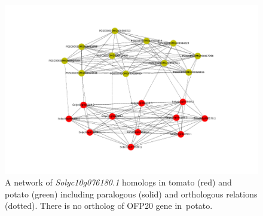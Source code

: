 \documentclass[applsci,article,accept,moreauthors,pdftex]{Definitions/mdpi}
\begin{document}
{ 
 \unskip
\begin{figure}[H]
\centering
\includegraphics[scale=1.25]{Figure6.pdf}
\caption{A network of \textit{Solyc10g076180.1} homologs in tomato (red) and potato (green) including paralogous (solid) and orthologous relations (dotted). There is no ortholog of OFP20 gene in~potato.}
\label{Figure6}
\end{figure}
\unskip

}
\end{document}
